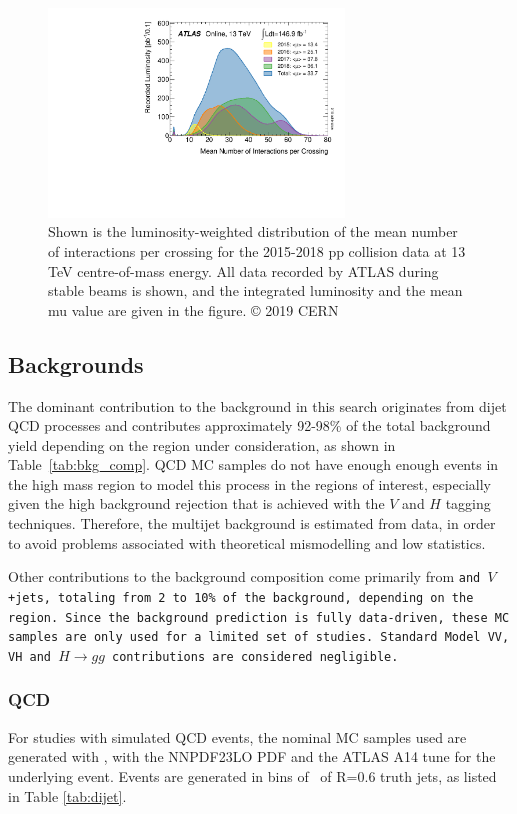 \begin{figure}[htbp!]
\begin{center}
    \includegraphics[width=0.7\textwidth]{mu_2015_2018}
\end{center}
\caption{
Shown is the luminosity-weighted distribution of the mean number of interactions per crossing for the 2015-2018 pp collision data at 13 TeV centre-of-mass energy.
All data recorded by ATLAS during stable beams is shown, and the integrated luminosity and the mean mu value are given in the figure. © 2019 CERN
}
\label{fig:mu_per_year}
\end{figure}

\subsection{Backgrounds}
The dominant contribution to the background in this search originates from dijet QCD processes and contributes approximately 92-98\% of the total background yield depending on the region under consideration, as shown in Table~\ref{tab:bkg_comp}.
QCD MC samples do not have enough enough events in the high mass region to model this process in the regions of interest, especially given the high background rejection that is achieved with the $V$ and $H$ tagging techniques.
Therefore, the multijet background is estimated from data, in order to avoid problems associated with theoretical mismodelling and low statistics.

Other contributions to the background composition come primarily from \tt and $V$+jets, totaling from 2 to 10\% of the background, depending on the region.
Since the background prediction is fully data-driven, these MC samples are only used for a limited set of studies.
Standard Model VV, VH and $H \rightarrow gg$ contributions are considered negligible.

\subsubsection{QCD}
For studies with simulated QCD events, the nominal MC samples used are generated with , with the NNPDF23LO PDF and the ATLAS A14 tune for the underlying event. Events are generated in bins of \pt\ of \akt R=0.6 truth jets, as listed in Table \ref{tab:dijet}.


